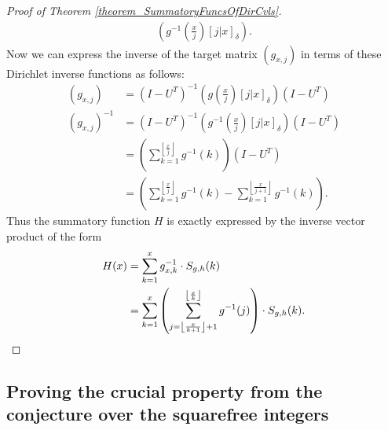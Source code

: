 \documentclass[11pt,reqno,a4letter]{article}
\numberwithin{figure}{section}
\numberwithin{table}{section}
\newcommand{\Iverson}[1]{\ensuremath{\left[#1\right]_{\delta}}}
\newcommand{\floor}[1]{\left\lfloor #1 \right\rfloor}
\theoremstyle{plain}
\numberwithin{theorem}{section}
\theoremstyle{definition}
\begin{document}
\begin{proof}[Proof of Theorem \ref{theorem_SummatoryFuncsOfDirCvls}]
\begin{align*}
     \left(g^{-1}\left(\frac{x}{j}\right) \Iverson{j|x}\right). 
\end{align*} 
Now we can express the inverse of the target matrix $(g_{x,j})$ in terms of these Dirichlet inverse functions 
as follows: 
\begin{align*} 
(g_{x,j}) & = (I-U^{T})^{-1} \left(g\left(\frac{x}{j}\right) \Iverson{j|x}\right) (I-U^{T}) \\ 
(g_{x,j})^{-1} & = (I-U^{T})^{-1} \left(g^{-1}\left(\frac{x}{j}\right) \Iverson{j|x}\right) (I-U^{T}) \\ 
     & = \left(\sum_{k=1}^{\floor{\frac{x}{j}}} g^{-1}(k)\right) (I-U^{T}) \\ 
     & = \left(\sum_{k=1}^{\floor{\frac{x}{j}}} g^{-1}(k) - \sum_{k=1}^{\floor{\frac{x}{j+1}}} g^{-1}(k)\right). 
\end{align*} 
Thus the summatory function $H$ is exactly expressed by the inverse vector product of the form 
\begin{align*} 
H(x) & = \sum_{k=1}^x g_{x,k}^{-1} \cdot S_{g,h}(k) \\ 
     & = \sum_{k=1}^x \left(\sum_{j=\floor{\frac{x}{k+1}}+1}^{\floor{\frac{x}{k}}} g^{-1}(j)\right) \cdot S_{g,h}(k). 
     \qedhere
\end{align*} 
\end{proof} 

\subsection{Proving the crucial property from the conjecture over the squarefree integers} 
\end{document}
